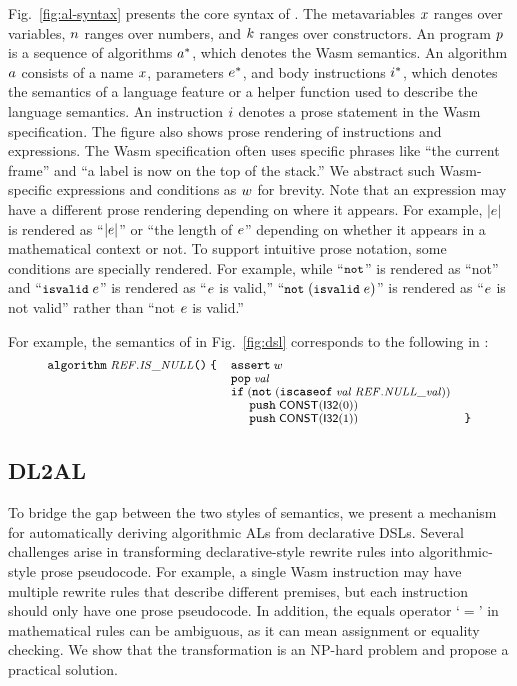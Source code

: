 Fig.~\ref{fig:al-syntax} presents the core syntax of \al.
The metavariables $x$ ranges over variables,
$n$ ranges over numbers, and
$k$ ranges over constructors.
An \al program $p$ is a sequence of algorithms $a^*$,
which denotes the Wasm semantics.
An algorithm $a$ consists of a name $x$, parameters $e^*$,
and body instructions $i^*$, which denotes the semantics of a
language feature or a helper function used to describe the language semantics.
An instruction $i$ denotes a prose statement in the Wasm specification.
The figure also shows prose rendering of instructions and expressions.
The Wasm specification often uses specific phrases like ``the current frame'' and 
``a label is now on the top of the stack.''
We abstract such Wasm-specific expressions and conditions as $w$ for brevity.
Note that an \al expression may have a different prose rendering
depending on where it appears. For example, $|e|$ is rendered as 
``$|e|$'' or ``the length of $e$'' depending on whether it appears in
a mathematical context or not.
To support intuitive prose notation, some \al conditions are specially rendered.
For example, while ``$\texttt{\small not}$'' is rendered as ``not'' and ``$\texttt{\small isvalid}\;e$''
is rendered as ``$e$ is valid,''
``$\texttt{\small not} \; (\texttt{\small isvalid} \; e)$'' is rendered as ``$e$ is not valid''
rather than ``not $e$ is valid.''

For example, the semantics of 
in Fig.~\ref{fig:dsl} corresponds to the following in \al:
\[
\footnotesize
\begin{array}{lll}
\texttt{\small algorithm} \; \mathit{REF.IS\_NULL} \texttt{\small (} \texttt{\small )} \; \texttt{\small \{} &
  \texttt{\small assert} \; w \\
& \texttt{\small pop} \; \mathit{val}\\
& \texttt{\small if} \; (\texttt{\small not} \; (\texttt{\small iscaseof} \; \mathit{val} \; \mathit{REF.NULL\_val}))\\
& \quad \; \; \texttt{\small push} \; \mathsf{CONST}(\mathsf{I32}(0)) \\
& \quad \; \; \texttt{\small push} \; \mathsf{CONST}(\mathsf{I32}(1)) & \texttt{\small \}}
\end{array}
\]

\subsection{DL2AL}\label{sec:dl2al} %
To bridge the gap between the two styles of semantics,
we present a mechanism for automatically deriving algorithmic ALs from declarative DSLs.
Several challenges arise in transforming declarative-style rewrite rules
into algorithmic-style prose pseudocode.
For example, a single Wasm instruction may have multiple rewrite rules
that describe different premises, but each instruction should only have one prose pseudocode.
In addition, the equals operator `$=$' in mathematical rules
can be ambiguous, as it can mean assignment or equality checking.
We show that the transformation is an NP-hard problem
and propose a practical solution.

